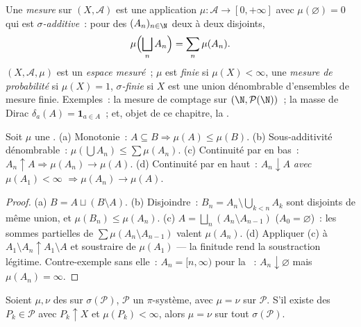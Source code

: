 \begin{definition}\label{def:b3:measure:measure}
Une \emph{mesure} sur $(X, \mathcal A)$ est une
application $\mu \colon \mathcal A \to [0, +\infty]$ avec
$\mu(\varnothing) = 0$ qui est \emph{$\sigma$-additive}~: pour
des $(A_n)_{n\in\N}$ deux à deux disjoints,
\[
\mu\Bigl(\bigsqcup_n A_n\Bigr) = \sum_n \mu(A_n).
\]
$(X, \mathcal A, \mu)$ est un \emph{espace mesuré}~; $\mu$ est
\emph{finie} si $\mu(X) < \infty$, une \emph{mesure de
probabilité} si $\mu(X) = 1$, \emph{$\sigma$-finie} si $X$ est
une union dénombrable d'ensembles de mesure finie. Exemples~:
la mesure de comptage sur $(\N, \mathcal P(\N))$~; la masse de
Dirac $\delta_a(A) = \mathbf 1_{a \in A}$~; et, objet de ce
chapitre, la .
\end{definition}

\begin{proposition}\label{prop:b3:measure:basics}
Soit $\mu$ une . (a) Monotonie~: $A \subseteq B
\Rightarrow \mu(A) \leq \mu(B)$. (b) Sous-additivité
dénombrable~: $\mu(\bigcup A_n) \leq \sum\mu(A_n)$. (c)
Continuité par en bas~: $A_n \uparrow A \Rightarrow \mu(A_n)
\to \mu(A)$. (d) Continuité par en haut~: $A_n \downarrow A$
\emph{avec $\mu(A_1) < \infty$} $\Rightarrow \mu(A_n) \to
\mu(A)$.
\end{proposition}

\begin{proof}
(a) $B = A \sqcup (B\setminus A)$. (b) Disjoindre~: $B_n = A_n
\setminus \bigcup_{k<n}A_k$ sont disjoints de même union, et
$\mu(B_n) \leq \mu(A_n)$. (c) $A = \bigsqcup_n (A_n \setminus
A_{n-1})$ ($A_0 = \varnothing$)~: les sommes partielles de
$\sum\mu(A_n\setminus A_{n-1})$ valent $\mu(A_n)$. (d)
Appliquer (c) à $A_1 \setminus A_n \uparrow A_1 \setminus A$
et soustraire de $\mu(A_1)$ --- la finitude rend la
soustraction légitime. Contre-exemple sans elle~: $A_n = [n,
\infty)$ pour la ~: $A_n \downarrow
\varnothing$ mais $\mu(A_n) = \infty$.
\end{proof}

\begin{theorem}[Unicité]\label{thm:b3:measure:uniqueness}
Soient $\mu, \nu$ des  sur $\sigma(\mathcal P)$,
$\mathcal P$ un $\pi$-système, avec $\mu = \nu$ sur $\mathcal
P$. S'il existe des $P_k \in \mathcal P$ avec $P_k \uparrow X$
et $\mu(P_k) < \infty$, alors $\mu = \nu$ sur tout
$\sigma(\mathcal P)$.
\end{theorem}

